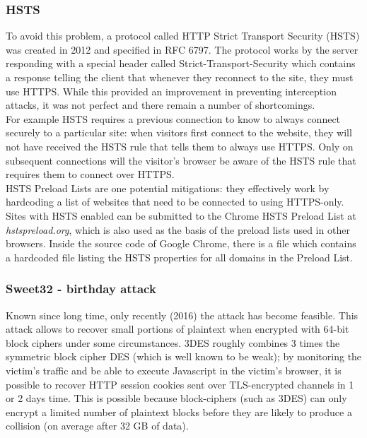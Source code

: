 \documentclass[a4paper, 10pt, titlepage]{article}
\begin{document}
\subsubsection*{HSTS}
To avoid this problem, a protocol called HTTP Strict Transport Security (HSTS) was created in 2012 and specified in RFC 6797. The protocol works by the server responding with a special header called Strict-Transport-Security which contains a response telling the client that whenever they reconnect to the site, they must use HTTPS. While this provided an improvement in preventing interception attacks, it was not perfect and there remain a number of shortcomings.\medskip\\
For example HSTS requires a previous connection to know to always connect securely to a particular site: when visitors first connect to the website, they will not have received the HSTS rule that tells them to always use HTTPS. Only on subsequent connections will the visitor's browser be aware of the HSTS rule that requires them to connect over HTTPS. \medskip\\
HSTS Preload Lists are one potential mitigations: they effectively work by hardcoding a list of websites that need to be connected to using HTTPS-only. Sites with HSTS enabled can be submitted to the Chrome HSTS Preload List at \textit{hstspreload.org}, which is also used as the basis of the preload lists used in other browsers. Inside the source code of Google Chrome, there is a file which contains a hardcoded file listing the HSTS properties for all domains in the Preload List.

\subsubsection{Sweet32 - birthday attack}
Known since long time, only recently (2016) the attack has become
feasible. This attack allows to recover small portions of plaintext when encrypted with 64-bit block ciphers under some circumstances.  3DES roughly combines 3 times the symmetric block cipher DES (which
is well known to be weak); by monitoring the victim’s traffic and be able to execute Javascript in the victim’s browser, it is possible to recover HTTP session cookies sent over TLS-encrypted channels in 1 or 2 days time. This is possible because block-ciphers (such as 3DES) can only encrypt a limited number of plaintext blocks before they are likely to produce a collision (on average after 32 GB of data).
\end{document}
